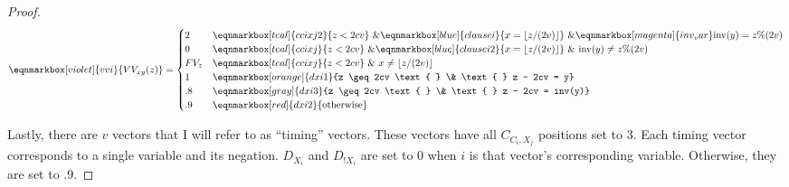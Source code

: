 \documentclass[sigconf]{acmart}
\begin{document}
\begin{proof}
\begin{equation}
\label{eq:variable_vector}
\eqnmarkbox[violet]{vvi}{VV_{xy}(z)} = \begin{cases} 
2 & \eqnmarkbox[teal]{ccixj2}{z < 2cv} \text{ } \& \eqnmarkbox[blue]{clausei}{x = {\lfloor z/(2v)\rfloor}}  \text{ } \& \eqnmarkbox[magenta]{inv_var}{\text{inv}(y) = z\%(2v)}\\
0 & \eqnmarkbox[teal]{ccixj}{z < 2cv} \text{ } \& \eqnmarkbox[blue]{clausei2}{x = {\lfloor z/(2v)\rfloor}}  \text{ } \& \text{ inv}(y) \neq z\%(2v)\\
FV_z & \eqnmarkbox[teal]{ccixj}{z < 2cv} \text{ } \& \text{ } x \neq {\lfloor z/(2v)\rfloor} \\
1 & \eqnmarkbox[orange]{dxi1}{z \geq 2cv \text{ } \& \text{ } z - 2cv = y}  \\
.8 & \eqnmarkbox[gray]{dxi3}{z \geq 2cv \text{ } \& \text{ } z - 2cv = inv(y)}  \\
.9 & \eqnmarkbox[red]{dxi2}{\text{otherwise}}
\end{cases}
\end{equation}

\vspace{1.5em}

\vspace{1.5em}

Lastly, there are $v$ vectors that I will refer to as ``timing'' vectors. These vectors have all $C_{C_{i},X_{j}}$ positions set to 3. Each timing vector corresponds to a single variable and its negation. $D_{X_{i}}$ and $D_{!X_{i}}$ are set to 0 when $i$ is that vector's corresponding variable. Otherwise, they are set to .9.


\end{proof}
\end{document}
